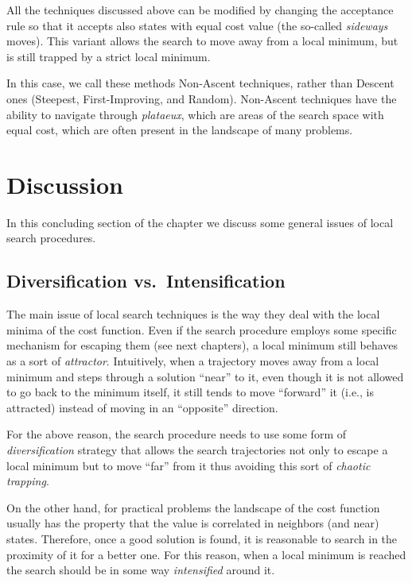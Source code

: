 All the techniques discussed above can be modified by changing the
acceptance rule so that it accepts also states with equal cost value (the
so-called \emph{sideways} moves). This variant allows the search to move away
from a local minimum, but is still trapped by a strict local minimum.

In this case, we call these methods Non-Ascent techniques, rather than Descent
ones (Steepest, First-Improving, and Random). Non-Ascent
techniques have the ability to navigate through \emph{plataeux},
which are areas of the search space with equal cost, which are often
present in the landscape of many problems.


\section{Discussion}\label{sec:discussion}

In this concluding section of the chapter we discuss some general
issues of local search procedures.

\subsection{Diversification vs.\ Intensification}

The main issue of local search techniques is the way they deal
with the local minima of the cost function. Even if the search
procedure employs some specific mechanism for escaping them (see next chapters),
a local minimum still behaves as a sort of \emph{attractor}.
Intuitively, when a trajectory moves away from a local minimum and
steps through a solution ``near'' to it, even though it is not allowed
to go back to the minimum itself, it still tends to move ``forward''
it (i.e., is attracted) instead of moving in an ``opposite'' direction.

For the above reason, the search procedure needs to use some form of
\emph{diversification} strategy that allows the search trajectories
not only to escape a local minimum but to move ``far'' from it thus
avoiding this sort of \emph{chaotic trapping}. 
 
On the other hand, for practical problems the landscape of the
cost function usually has the property that the value is
correlated in neighbors (and near) states.  Therefore, once a good
solution is found, it is reasonable to search in the proximity of it
for a better one. For this reason, when a local minimum is reached the
search should be in some way \emph{intensified} around it.  

